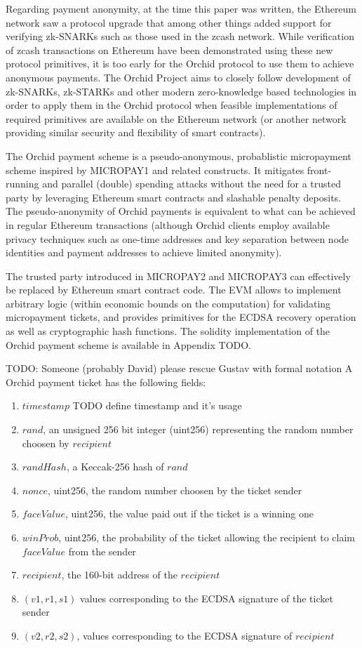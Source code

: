 Regarding payment anonymity, at the time this paper was written, the Ethereum network saw a protocol upgrade \cite{ETHByz} that among other things added support for verifying zk-SNARKs such as those used in the zcash network\cite{zcash-zksnarks}. While verification of zcash transactions on Ethereum have been demonstrated using these new protocol primitives, it is too early for the Orchid protocol to use them to achieve anonymous payments. The Orchid Project aims to closely follow development of zk-SNARKs, zk-STARKs \cite{zkstarks} and other modern zero-knowledge based technologies in order to apply them in the Orchid protocol when feasible implementations of required primitives are available on the Ethereum network (or another network providing similar security and flexibility of smart contracts).

The Orchid payment scheme is a pseudo-anonymous, probablistic micropayment scheme inspired by MICROPAY1 and related constructs. It mitigates front-running and parallel (double) spending attacks without the need for a trusted party by leveraging Ethereum smart contracts and slashable penalty deposits. The pseudo-anonymity of Orchid payments is equivalent to what can be achieved in regular Ethereum transactions (although Orchid clients employ available privacy techniques such as one-time addresses and key separation between node identities and payment addresses to achieve limited anonymity).

The trusted party introduced in MICROPAY2 and MICROPAY3 can effectively be replaced by Ethereum smart contract code. The EVM allows to implement arbitrary logic (within economic bounds on the computation) for validating micropayment tickets, and provides primitives \cite{yellowpaper} for the ECDSA recovery operation \cite{ECDSA} as well as cryptographic hash functions. The solidity implementation of the Orchid payment scheme is available in Appendix TODO.

TODO: Someone (probably David) please rescue Gustav with formal notation
A Orchid payment ticket has the following fields:

\begin{enumerate}
\item $timestamp$ TODO define timestamp and it's usage
\item $rand$, an unsigned 256 bit integer (uint256) representing the random number choosen by $recipient$
\item $randHash$, a Keccak-256 hash of $rand$
\item $nonce$, uint256, the random number choosen by the ticket sender
\item $faceValue$, uint256, the value paid out if the ticket is a winning one
\item $winProb$, uint256, the probability of the ticket allowing the recipient to claim $faceValue$ from the sender
\item $recipient$, the 160-bit address of the $recipient$
\item $(v1, r1, s1)$ values corresponding to the ECDSA signature of the ticket sender
\item $(v2, r2, s2)$, values corresponding to the ECDSA signature of $recipient$
\end{enumerate}

